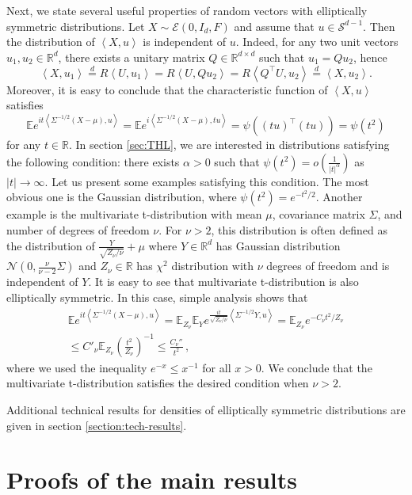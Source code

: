 \documentclass[12pt]{article}
\def\l{\left}
\def\r{\right}
\newcommand{\mb}{\mathbb}
\newcommand{\dotp}[2]{\left\langle#1,#2\right\rangle}
\theoremstyle{thmstyletwo}%
\theoremstyle{thmstylethree}%
\begin{document}
Next, we state several useful properties of random vectors with elliptically symmetric distributions. Let $X \sim \mathcal{E}(0, I_d, F)$ and assume that $u \in \mathcal{S}^{d-1}$. Then the distribution of $\dotp{X}{u}$ is independent of $u$. Indeed, for any two unit vectors $u_1, u_2 \in \mb R^d$, there exists a unitary matrix $Q \in \mb R^{d\times d}$ such that $u_1 = Qu_2$, hence 
\[
\dotp{X}{u_1} \overset{d}{=} R\dotp{U}{u_1} = R\dotp{U}{Qu_2} = R\dotp{Q^\top U}{u_2} \overset{d}{=} \dotp{X}{u_2}.
\]
Moreover, it is easy to conclude that the characteristic function of $\dotp{X}{u}$ satisfies 
\[
\mb E e^{it\dotp{\Sigma^{-1/2}(X-\mu)}{u}} = \mb E e^{i\dotp{\Sigma^{-1/2}(X-\mu)}{tu}} = \psi\l((tu)^\top(tu)\r) = \psi(t^2)
\]
for any $t \in \mb R$. In section \ref{sec:THL}, we are interested in distributions satisfying the following condition: there exists $\alpha > 0$ such that $\psi(t^2) = o\l(\frac{1}{|t|^\alpha}\r)$ as $|t| \rightarrow \infty$. 
Let us present some examples satisfying this condition. The most obvious one is the Gaussian distribution, where $\psi(t^2) = e^{-t^2/2}$. Another example is the multivariate t-distribution with mean $\mu$, covariance matrix $\Sigma$, and number of degrees of freedom $\nu$. For $\nu > 2$, this distribution is often defined as the distribution of $\frac{Y}{\sqrt{Z_\nu / \nu}} + \mu$ where $Y \in \mb R^d$ has Gaussian distribution $\mathcal{N}(0, \frac{\nu}{\nu-2}\Sigma)$ and $Z_\nu \in \mb R$ has $\chi^2$ distribution with $\nu$ degrees of freedom and is independent of $Y$. It is easy to see that multivariate t-distribution is also elliptically symmetric. In this case, simple analysis shows that
\begin{multline*}
    \mb E e^{it\dotp{\Sigma^{-1/2}(X-\mu)}{u}} = \mb E_{Z_\nu} \mb E_Y e^{\frac{it}{\sqrt{Z_\nu / \nu}}\dotp{\Sigma^{-1/2}Y}{u}} = \mb E_{Z_\nu} e^{-C_{\nu}t^2/Z_\nu} \\
    \leq C'_{\nu}\mb E_{Z_\nu} \l(\frac{t^2}{Z_{\nu}}\r)^{-1} \leq  \frac{C_{\nu}''}{t^2}\,,
\end{multline*}
where we used the inequality $e^{-x} \leq x^{-1}$ for all $x > 0$. We conclude that the multivariate t-distribution satisfies the desired condition when $\nu > 2$.


Additional technical results for densities of elliptically symmetric distributions are given in section \ref{section:tech-results}.



\section{Proofs of the main results}
\label{sec:proof}
\end{document}
